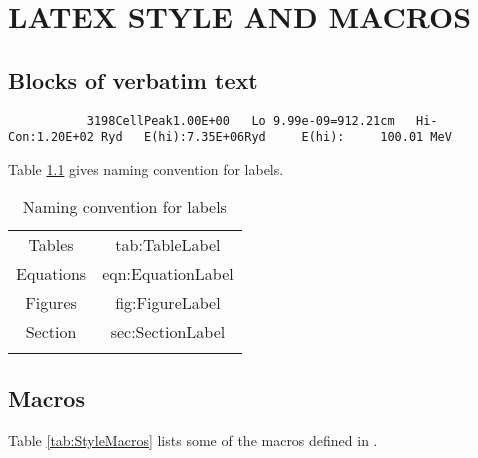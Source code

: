 \chapter{LATEX STYLE AND MACROS}

\section{Blocks of verbatim text}
{\setverbatimfontsize{\tiny}
\begin{verbatim}
           3198CellPeak1.00E+00   Lo 9.99e-09=912.21cm   Hi-Con:1.20E+02 Ryd   E(hi):7.35E+06Ryd     E(hi):     100.01 MeV
\end{verbatim}
}


Table \ref{tab:LabelNames} gives naming convention for labels.

\begin{table}
\centering
\caption{Naming convention for labels}
\begin{tabular}{c c}
\hline
Tables & tab:TableLabel \\
Equations & eqn:EquationLabel \\
Figures & fig:FigureLabel \\
Section & sec:SectionLabel \\
\hline
\label{tab:LabelNames}
\end{tabular}
\end{table}


\section{Macros}

Table \ref{tab:StyleMacros} lists some of the macros defined
in .

